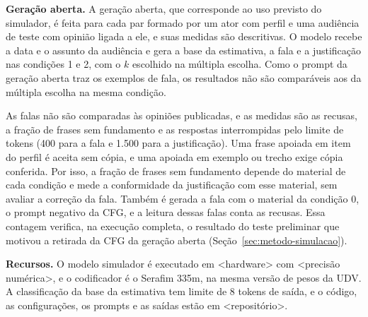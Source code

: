 \textbf{Geração aberta.} A geração aberta, que corresponde ao uso previsto do simulador, é feita
para cada par formado por um ator com perfil e uma audiência de teste com opinião ligada a ele, e
suas medidas são descritivas. O modelo recebe a data e o assunto da audiência e gera a base da
estimativa, a fala e a justificação nas condições 1 e 2, com o $k$ escolhido na múltipla escolha.
Como o prompt da geração aberta traz os exemplos de fala, os resultados não são comparáveis aos da
múltipla escolha na mesma condição.

As falas não são comparadas às opiniões publicadas, e as medidas são as recusas, a fração de frases
sem fundamento e as respostas interrompidas pelo limite de tokens (400 para a fala e 1.500 para a
justificação). Uma frase apoiada em item do perfil é aceita sem cópia, e uma apoiada em exemplo ou
trecho exige cópia conferida. Por isso, a fração de frases sem fundamento depende do material de
cada condição e mede a conformidade da justificação com esse material, sem avaliar a correção da
fala. Também é gerada a fala com o material da condição 0, o prompt negativo da CFG, e a leitura
dessas falas conta as recusas. Essa contagem verifica, na execução completa, o resultado do teste
preliminar que motivou a retirada da CFG da geração aberta (Seção~\ref{sec:metodo-simulacao}).

\textbf{Recursos.} O modelo simulador é executado em <hardware> com <precisão numérica>, e o
codificador é o Serafim 335m, na mesma versão de pesos da UDV. A classificação da base da estimativa
tem limite de 8 tokens de saída, e o código, as configurações, os prompts e as saídas estão em
<repositório>.
